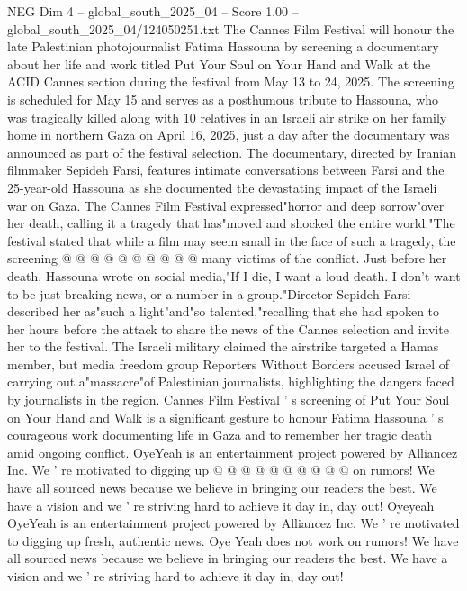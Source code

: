\begin{textsample}{NEG Dim 4 – global\_south\_2025\_04 – Score 1.00 – global\_south\_2025\_04/124050251.txt}  \label{ex:f4_neg_218}
The Cannes Film Festival will honour the late Palestinian photojournalist Fatima Hassouna by screening a documentary about her life and work titled Put Your Soul on Your Hand and Walk at the ACID Cannes section during the festival from May 13 to 24, 2025.
The screening is scheduled for May 15 and serves as a posthumous tribute to Hassouna, who was tragically killed along with 10 relatives in an Israeli air strike on her family home in northern Gaza on April 16, 2025, just a day after the documentary was announced as part of the festival selection.
The documentary, directed by Iranian filmmaker Sepideh Farsi, features intimate conversations between Farsi and the 25-year-old Hassouna as she documented the devastating impact of the Israeli war on Gaza.
The Cannes Film Festival expressed"horror and deep sorrow"over her death, calling it a tragedy that has"moved and shocked the entire world."The festival stated that while a film may seem small in the face of such a tragedy, the screening @ @ @ @ @ @ @ @ @ @ many victims of the conflict.
Just before her death, Hassouna wrote on social media,"If I die, I want a loud death.
I don't want to be just breaking news, or a number in a group."Director Sepideh Farsi described her as"such a light"and"so talented,"recalling that she had spoken to her hours before the attack to share the news of the Cannes selection and invite her to the festival.
The Israeli military claimed the airstrike targeted a Hamas member, but media freedom group Reporters Without Borders accused Israel of carrying out a"massacre"of Palestinian journalists, highlighting the dangers faced by journalists in the region.
Cannes Film Festival ' s screening of Put Your Soul on Your Hand and Walk is a significant gesture to honour Fatima Hassouna ' s courageous work documenting life in Gaza and to remember her tragic death amid ongoing conflict.
OyeYeah is an entertainment project powered by Alliancez Inc.
We ' re motivated to digging up @ @ @ @ @ @ @ @ @ @ on rumors!
We have all sourced news because we believe in bringing our readers the best.
We have a vision and we ' re striving hard to achieve it day in, day out!
Oyeyeah OyeYeah is an entertainment project powered by Alliancez Inc.
We ' re motivated to digging up fresh, authentic news.
Oye Yeah does not work on rumors!
We have all sourced news because we believe in bringing our readers the best.
We have a vision and we ' re striving hard to achieve it day in, day out!

\end{textsample}
